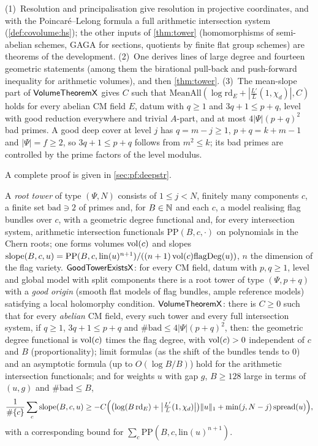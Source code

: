 \begin{proofoutline}
(1)~Resolution and principalisation give resolution in projective coordinates, and with the
Poincar\'e--Lelong formula a full arithmetic intersection system (\cref{def:covolume:hs}); the other
inputs of \cref{thm:tower} (homomorphisms of semi-abelian schemes, GAGA for sections, quotients by
finite flat group schemes) are theorems of the development. (2)~One derives lines of large degree and
fourteen geometric statements (among them the birational pull-back and push-forward inequality for
arithmetic volumes), and then \cref{thm:tower}. (3)~The mean-slope part of $\mathsf{VolumeTheoremX}$
gives $C$ such that $\mathrm{MeanAll}(\log\mathrm{rd}_E+|\frac{L'}{L}(1,\chi_d)|,C)$ holds for every abelian CM
field $E$, datum with $q\ge1$ and $3q+1\le p+q$, level with good reduction everywhere and trivial
$A$-part, and at most $4|\Psi|(p+q)^2$ bad primes. A good deep cover at level $j$ has $q=m-j\ge1$,
$p+q=k+m-1$ and $|\Psi|=f\ge2$, so $3q+1\le p+q$ follows from $m^2\le k$; its bad primes are controlled
by the prime factors of the level modulus.

A complete proof is given in \cref{sec:pf:deepstr}.
\end{proofoutline}

\begin{definition}\label{def:covolume:tower}
A \emph{root tower} of type $(\Psi,N)$ consists of $1\le j<N$, finitely many components $c$, a finite set
$\mathrm{bad}\ni2$ of primes and, for $B\in\mathbb{N}$ and each $c$, a model realising flag bundles over $c$, with
a geometric degree functional and, for every intersection system, arithmetic intersection functionals
$\mathrm{PP}(B,c,\cdot)$ on polynomials in the Chern roots; one forms volumes $\operatorname{vol}(c)$ and slopes
$\mathrm{slope}(B,c,u)=\mathrm{PP}(B,c,\mathrm{lin}(u)^{n+1})/((n+1)\operatorname{vol}(c)\mathrm{flagDeg}(u))$, $n$ the
dimension of the flag variety. $\mathsf{GoodTowerExistsX}$: for every CM field, datum with $p,q\ge1$,
level and global model with split components there is a root tower of type $(\Psi,p+q)$ with a
\emph{good origin} (smooth flat models of flag bundles, ample reference models) satisfying a local
holomorphy condition. $\mathsf{VolumeTheoremX}$: there is $C\ge0$ such that for every \emph{abelian} CM
field, every such tower and every full intersection system, if $q\ge1$, $3q+1\le p+q$ and
$\#\mathrm{bad}\le4|\Psi|(p+q)^2$, then: the geometric degree functional is $\operatorname{vol}(c)$ times the flag
degree, with $\operatorname{vol}(c)>0$ independent of $c$ and $B$ (proportionality); limit formulas (as the shift of
the bundles tends to $0$) and an asymptotic formula (up to $O(\log B/B)$) hold for the arithmetic
intersection functionals; and for weights $u$ with gap $g$, $B\ge128$ large in terms of $(u,g)$ and
$\#\mathrm{bad}\le B$,
\[
\frac1{\#\{c\}}\sum_c\mathrm{slope}(B,c,u)\ge-C\Bigl(\bigl(\log(B\,\mathrm{rd}_E)+\bigl|\tfrac{L'}{L}(1,\chi_d)\bigr|\bigr)\|u\|_1+\min(j,N-j)\,\mathrm{spread}(u)\Bigr),
\]
with a corresponding bound for $\sum_c\mathrm{PP}(B,c,\mathrm{lin}(u)^{n+1})$.
\end{definition}


